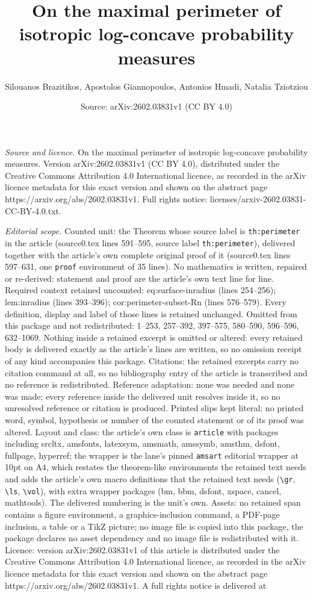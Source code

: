 \documentclass[10pt,a4paper]{amsart}
\title[On the maximal perimeter of isotropic log-concave probabilit]{On the maximal perimeter of isotropic log-concave probability measures}
\author{Silouanos Brazitikos, Apostolos Giannopoulos, Antonios Hmadi, Natalia Tziotziou}
\date{Source: arXiv:2602.03831v1 (CC BY 4.0)}
\begin{document}
\maketitle

\noindent\emph{Source and licence.} On the maximal perimeter of isotropic log-concave probability measures. Version arXiv:2602.03831v1 (CC BY 4.0), distributed under the Creative Commons Attribution 4.0 International licence, as recorded in the arXiv licence metadata for this exact version and shown on the abstract page https://arxiv.org/abs/2602.03831v1. Full rights notice: licenses/arxiv-2602.03831-CC-BY-4.0.txt.\par\smallskip

\noindent\textit{Editorial scope.} Counted unit: the Theorem whose source label is \texttt{th:perimeter} in the article (source0.tex lines 591--595, source label \texttt{th:perimeter}), delivered together with the article's own complete original proof of it (source0.tex lines 597--631, one \texttt{proof} environment of 35 lines). No mathematics is written, repaired or re-derived: statement and proof are the article's own text line for line. Required context retained uncounted: eq:surface-inradius (lines 254--256); lem:inradius (lines 393--396); cor:perimeter-subset-Rn (lines 576--579). Every definition, display and label of those lines is retained unchanged. Omitted from this package and not redistributed: 1--253, 257--392, 397--575, 580--590, 596--596, 632--1069. Nothing inside a retained excerpt is omitted or altered: every retained body is delivered exactly as the article's lines are written, so no omission receipt of any kind accompanies this package. Citations: the retained excerpts carry no citation command at all, so no bibliography entry of the article is transcribed and no reference is redistributed. Reference adaptation: none was needed and none was made; every reference inside the delivered unit resolves inside it, so no unresolved reference or citation is produced. Printed slips kept literal: no printed word, symbol, hypothesis or number of the counted statement or of its proof was altered. Layout and class: the article's own class is \texttt{article} with packages including srcltx, amsfonts, latexsym, amsmath, amssymb, amsthm, dsfont, fullpage, hyperref; the wrapper is the lane's pinned \texttt{amsart} editorial wrapper at 10pt on A4, which restates the theorem-like environments the retained text needs and adds the article's own macro definitions that the retained text needs (\texttt{\textbackslash gr}, \texttt{\textbackslash ls}, \texttt{\textbackslash vol}), with extra wrapper packages (bm, bbm, dsfont, xspace, cancel, mathtools). The delivered numbering is the unit's own. Assets: no retained span contains a figure environment, a graphics-inclusion command, a PDF-page inclusion, a table or a TikZ picture; no image file is copied into this package, the package declares no asset dependency and no image file is redistributed with it. Licence: version arXiv:2602.03831v1 of this article is distributed under the Creative Commons Attribution 4.0 International licence, as recorded in the arXiv licence metadata for this exact version and shown on the abstract page https://arxiv.org/abs/2602.03831v1. A full rights notice is delivered at 
\end{document}
